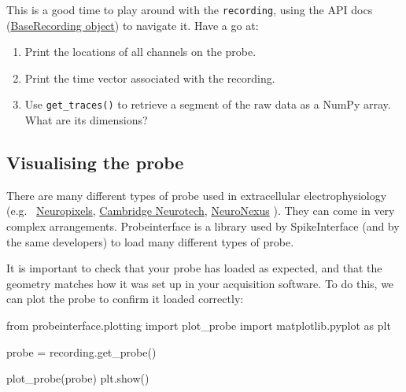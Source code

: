 \documentclass[
  letterpaper,
  DIV=11,
  numbers=noendperiod]{scrreprt}
\newenvironment{Shaded}{\begin{snugshade}}{\end{snugshade}}
\newcommand{\ImportTok}[1]{\textcolor[rgb]{0.00,0.46,0.62}{#1}}
\newcommand{\NormalTok}[1]{\textcolor[rgb]{0.00,0.23,0.31}{#1}}
\newcommand{\OperatorTok}[1]{\textcolor[rgb]{0.37,0.37,0.37}{#1}}
\providecommand{\tightlist}{%
  \setlength{\itemsep}{0pt}\setlength{\parskip}{0pt}}
\begin{document}
\begin{tcolorbox}[enhanced jigsaw, arc=.35mm, bottomrule=.15mm, bottomtitle=1mm, breakable, colback=white, colbacktitle=quarto-callout-tip-color!10!white, colframe=quarto-callout-tip-color-frame, coltitle=black, left=2mm, leftrule=.75mm, opacityback=0, opacitybacktitle=0.6, rightrule=.15mm, title=\textcolor{quarto-callout-tip-color}{\faLightbulb}\hspace{0.5em}{Some things to try}, titlerule=0mm, toprule=.15mm, toptitle=1mm]

This is a good time to play around with the \texttt{recording}, using
the API docs
(\href{https://spikeinterface.readthedocs.io/en/latest/api.html\#spikeinterface.core.BaseRecording}{BaseRecording
object}) to navigate it. Have a go at:

\begin{enumerate}
\def\labelenumi{\arabic{enumi}.}
\tightlist
\item
  Print the locations of all channels on the probe.
\item
  Print the time vector associated with the recording.
\item
  Use \texttt{get\_traces()} to retrieve a segment of the raw data as a
  NumPy array. What are its dimensions?
\end{enumerate}

\end{tcolorbox}

\subsection*{Visualising the probe}\label{visualising-the-probe}

There are many different types of probe used in extracellular
electrophysiology (e.g.~
\href{https://www.neuropixels.org/}{Neuropixels},
\href{https://www.cambridgeneurotech.com/neural-probes}{Cambridge
Neurotech},
\href{https://www.neuronexus.com/products/electrode-arrays/}{NeuroNexus}
). They can come in very complex arrangements. Probeinterface is a
library used by SpikeInterface (and by the same developers) to load many
different types of probe.

It is important to check that your probe has loaded as expected, and
that the geometry matches how it was set up in your acquisition
software. To do this, we can plot the probe to confirm it loaded
correctly:

\begin{Shaded}
\begin{Highlighting}[]
\ImportTok{from}\NormalTok{ probeinterface.plotting }\ImportTok{import}\NormalTok{ plot\_probe}
\ImportTok{import}\NormalTok{ matplotlib.pyplot }\ImportTok{as}\NormalTok{ plt}

\NormalTok{probe }\OperatorTok{=}\NormalTok{ recording.get\_probe()}

\NormalTok{plot\_probe(probe)}
\NormalTok{plt.show()}
\end{Highlighting}
\end{Shaded}
\end{document}

